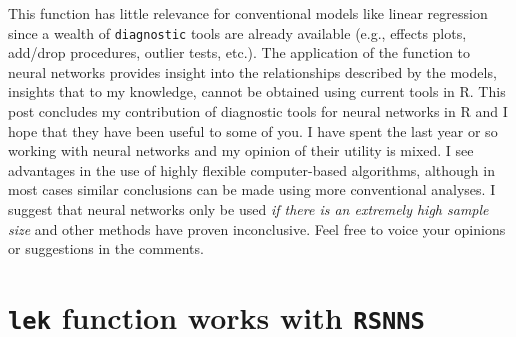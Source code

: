 \documentclass[]{book}
\begin{document}
This function has little relevance for conventional models like linear regression since a wealth of \texttt{diagnostic} tools are already available (e.g., effects plots, add/drop procedures, outlier tests, etc.). The application of the function to neural networks provides insight into the relationships described by the models, insights that to my knowledge, cannot be obtained using current tools in R. This post concludes my contribution of diagnostic tools for neural networks in R and I hope that they have been useful to some of you. I have spent the last year or so working with neural networks and my opinion of their utility is mixed. I see advantages in the use of highly flexible computer-based algorithms, although in most cases similar conclusions can be made using more conventional analyses. I suggest that neural networks only be used \emph{if there is an extremely high sample size} and other methods have proven inconclusive. Feel free to voice your opinions or suggestions in the comments.

\hypertarget{lek-function-works-with-rsnns}{%
\section{\texorpdfstring{\texttt{lek} function works with \texttt{RSNNS}}{lek function works with RSNNS}}\label{lek-function-works-with-rsnns}}
\end{document}
